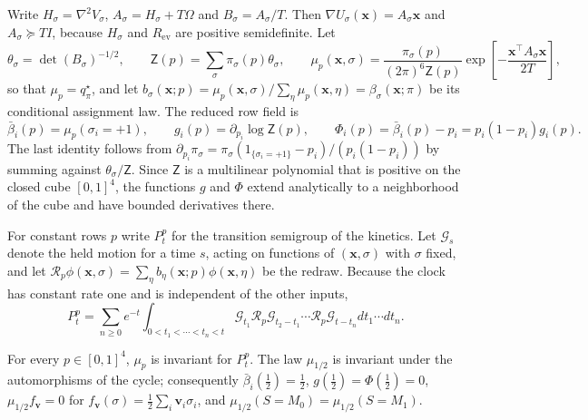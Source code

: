 Write $H_\sigma=\nabla^2V_\sigma$, $A_\sigma=H_\sigma+T\Omega$ and $B_\sigma=A_\sigma/T$. Then $\nabla U_\sigma(\mathbf x)=A_\sigma\mathbf x$ and $A_\sigma\succeq TI$, because $H_\sigma$ and $R_{\mathrm{ev}}$ are positive semidefinite. Let
\[
\theta_\sigma=\det(B_\sigma)^{-1/2},\qquad
\mathsf Z(p)=\sum_\sigma\pi_\sigma(p)\theta_\sigma,\qquad
\mu_p(\mathbf x,\sigma)=\frac{\pi_\sigma(p)}{(2\pi)^6\mathsf Z(p)}\exp\left[-\frac{\mathbf x^\top A_\sigma\mathbf x}{2T}\right],
\]
so that $\mu_p=q^\star_\pi$, and let $b_\sigma(\mathbf x;p)=\mu_p(\mathbf x,\sigma)/\sum_\eta\mu_p(\mathbf x,\eta)=\beta_\sigma(\mathbf x;\pi)$ be its conditional assignment law. The reduced row field is
\begin{equation}
\bar\beta_i(p)=\mu_p(\sigma_i=+1),\qquad
g_i(p)=\partial_{p_i}\log\mathsf Z(p),\qquad
\Phi_i(p)=\bar\beta_i(p)-p_i=p_i(1-p_i)g_i(p).
\label{eq:sel_reduced_field}
\end{equation}
The last identity follows from $\partial_{p_i}\pi_\sigma=\pi_\sigma(1_{\{\sigma_i=+1\}}-p_i)/(p_i(1-p_i))$ by summing against $\theta_\sigma/\mathsf Z$. Since $\mathsf Z$ is a multilinear polynomial that is positive on the closed cube $[0,1]^4$, the functions $g$ and $\Phi$ extend analytically to a neighborhood of the cube and have bounded derivatives there.

For constant rows $p$ write $P^p_t$ for the transition semigroup of the kinetics. Let $\mathcal G_s$ denote the held motion for a time $s$, acting on functions of $(\mathbf x,\sigma)$ with $\sigma$ fixed, and let $\mathcal R_p\phi(\mathbf x,\sigma)=\sum_\eta b_\eta(\mathbf x;p)\phi(\mathbf x,\eta)$ be the redraw. Because the clock has constant rate one and is independent of the other inputs,
\begin{equation}
P^p_t=\sum_{n\ge0}e^{-t}\int_{0<t_1<\cdots<t_n<t}\mathcal G_{t_1}\mathcal R_p\mathcal G_{t_2-t_1}\cdots\mathcal R_p\mathcal G_{t-t_n}dt_1\cdots dt_n.
\label{eq:sel_uniformization}
\end{equation}

\begin{lemma}\label{lem:sel_invariance}
For every $p\in[0,1]^4$, $\mu_p$ is invariant for $P^p_t$. The law $\mu_{1/2}$ is invariant under the automorphisms of the cycle; consequently $\bar\beta_i(\frac12)=\frac12$, $g(\frac12)=\Phi(\frac12)=0$, $\mu_{1/2}f_{\mathbf v}=0$ for $f_{\mathbf v}(\sigma)=\frac12\sum_i\mathbf v_i\sigma_i$, and $\mu_{1/2}(S=M_0)=\mu_{1/2}(S=M_1)$.
\end{lemma}

